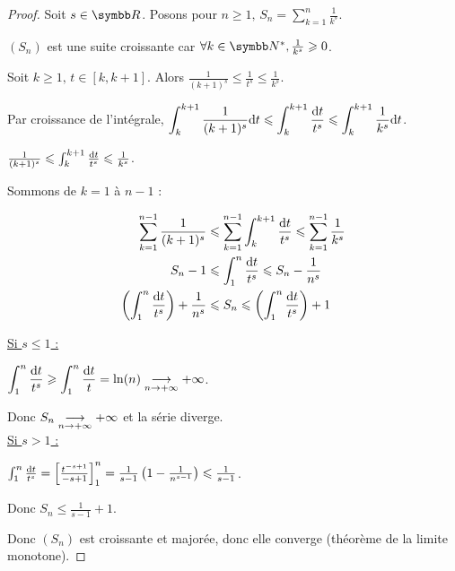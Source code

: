 
\begin{proof}
    Soit $s \in \R$. 
    Posons pour $\displaystyle n \geqslant 1, \, S_n = \sum_{k = 1 }^{n} \frac{1}{k^s}$.

    $(S_n)$ est une suite croissante car $\forall k \in \N^*, \frac 1 {k^s} \geqslant 0$. 

    Soit $k \geqslant 1, \, t \in [k, k+1]$. Alors $\frac 1 {(k + 1)^s} \leqslant \frac 1 {t^s} \leqslant \frac 1 {k^s}$.

    \svspace Par croissance de l'intégrale, $\displaystyle \int_{k }^{k + 1} \frac 1 {(k + 1)^s} \text d t \leqslant \int_{k }^{k + 1} \frac{\text d t}{t^s} \leqslant \int_{k }^{k + 1} \frac 1 {k^s} \text d t$.

    $\frac 1 {(k + 1)^s} \leqslant \int_{k }^{k + 1} \frac{\text d t}{t^s} \leqslant \frac 1 {k^s}$.

    Sommons de $k = 1$ à $n - 1$ : 

    \begin{align*}
        \sum_{k = 1}^{n - 1} \frac 1 {(k + 1)^s} & \leqslant \sum_{k = 1}^{n - 1} \int_{k }^{k + 1} \frac{\text d t}{t^s} \leqslant \sum_{k = 1}^{n - 1} \frac 1 {k^s} \\
        S_n - 1 & \leqslant \int_{1 }^{n } \frac{\text d t}{t^s} \leqslant S_n  - \frac 1 {n^s} \\
        \left( \int_{1}^{n } \frac{\text d t}{t^s} \right) + \frac 1 {n^s} & \leqslant S_n \leqslant \left( \int_{1 }^{n } \frac{\text d t}{t^s} \right) + 1
    \end{align*}

    \uline{Si $s \leqslant 1$ :}

    \avspace $\displaystyle \int_{1 }^{n} \frac{\text d t}{t^s}  \geqslant \int_{1 }^{n } \frac{\text d t}{t} = \ln(n) \underset{n \to + \infty}{\longrightarrow} +\infty$.

    Donc $S_n \underset{n \to + \infty}{\longrightarrow} +\infty$ et la série diverge. \\

    \uline{Si $s > 1$ :}

    \svspace $\int_{1 }^{n} \frac{\text d t}{t^s}  = \left[ \frac{t^{-s + 1}}{-s + 1} \right]_{1}^{n} = \frac 1 {s - 1} \left( 1 - \frac 1 {n^{s - 1}} \right) \leqslant \frac 1 {s - 1}$.

    Donc $S_n \leqslant \frac 1 {s - 1} + 1$.

    Donc $(S_n)$ est croissante et majorée, donc elle converge (théorème de la limite monotone).
\end{proof}

